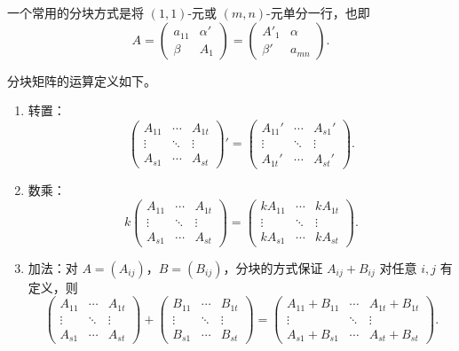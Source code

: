 一个常用的分块方式是将 $(1,1)$-元或 $(m,n)$-元单分一行，也即
\[
A=\begin{pmatrix}
	a_{11}&\alpha'\\
	\beta&A_1
\end{pmatrix}
=\begin{pmatrix}
	A'_1&\alpha\\
	\beta'&a_{mn}
\end{pmatrix}.
\]

分块矩阵的运算定义如下。

\begin{definition}\label{3.5.3}\label{p1:concept:c3-l1440}
	\begin{enumerate}
		\item 转置：
		\[
		\begin{pmatrix}
			A_{11}&\cdots&A_{1t}\\
			\vdots&\ddots&\vdots\\
			A_{s1}&\cdots&A_{st}
		\end{pmatrix}'
		=
		\begin{pmatrix}
			A_{11}'&\cdots&A_{s1}'\\
			\vdots&\ddots&\vdots\\
			A_{1t}'&\cdots&A_{st}'
		\end{pmatrix}.
		\]
		
		\item 数乘：
		\[
		k\begin{pmatrix}
			A_{11}&\cdots&A_{1t}\\
			\vdots&\ddots&\vdots\\
			A_{s1}&\cdots&A_{st}
		\end{pmatrix}
		=
		\begin{pmatrix}
			kA_{11}&\cdots&kA_{1t}\\
			\vdots&\ddots&\vdots\\
			kA_{s1}&\cdots&kA_{st}
		\end{pmatrix}.
		\]
		
		\item 加法：对 $A=(A_{ij})$，$B=(B_{ij})$，分块的方式保证 $A_{ij}+B_{ij}$ 对任意 $i,j$ 有定义，则
		\[
		\begin{pmatrix}
			A_{11}&\cdots&A_{1t}\\
			\vdots&\ddots&\vdots\\
			A_{s1}&\cdots&A_{st}
		\end{pmatrix}
		+
		\begin{pmatrix}
			B_{11}&\cdots&B_{1t}\\
			\vdots&\ddots&\vdots\\
			B_{s1}&\cdots&B_{st}
		\end{pmatrix}
		=
		\begin{pmatrix}
			A_{11}+B_{11}&\cdots&A_{1t}+B_{1t}\\
			\vdots&\ddots&\vdots\\
			A_{s1}+B_{s1}&\cdots&A_{st}+B_{st}
		\end{pmatrix}.
		\]
		

\end{enumerate}
\end{definition}
